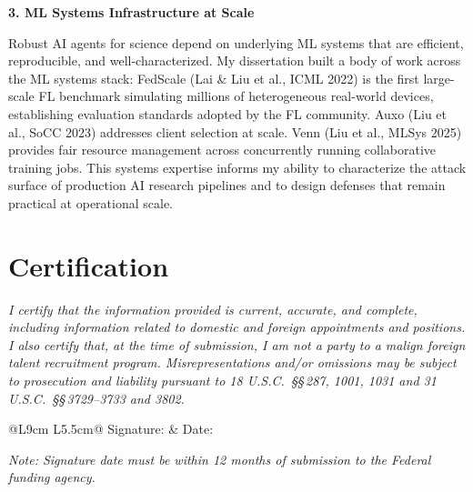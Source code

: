 \documentclass[10pt]{article}
\begin{document}
\medskip

\textbf{3. ML Systems Infrastructure at Scale}

Robust AI agents for science depend on underlying ML systems that are efficient, reproducible, and well-characterized. My dissertation built a body of work across the ML systems stack: FedScale (Lai \& Liu et al., ICML 2022) is the first large-scale FL benchmark simulating millions of heterogeneous real-world devices, establishing evaluation standards adopted by the FL community. Auxo (Liu et al., SoCC 2023) addresses client selection at scale. Venn (Liu et al., MLSys 2025) provides fair resource management across concurrently running collaborative training jobs. This systems expertise informs my ability to characterize the attack surface of production AI research pipelines and to design defenses that remain practical at operational scale.

\section*{Certification}

\vspace{3pt}
{\small\itshape I certify that the information provided is current, accurate, and complete, including information related to domestic and foreign appointments and positions. I also certify that, at the time of submission, I am not a party to a malign foreign talent recruitment program. Misrepresentations and/or omissions may be subject to prosecution and liability pursuant to 18 U.S.C.\ §§\,287, 1001, 1031 and 31 U.S.C.\ §§\,3729--3733 and 3802.}

\vspace{10pt}
\begin{tabular}{@{}L{9cm} L{5.5cm}@{}}
Signature:\enspace\underline{\hspace{7cm}} & Date:\enspace\underline{\hspace{4cm}} \\
\end{tabular}

\vspace{8pt}
{\footnotesize\textit{Note: Signature date must be within 12 months of submission to the Federal funding agency.}}
\end{document}
